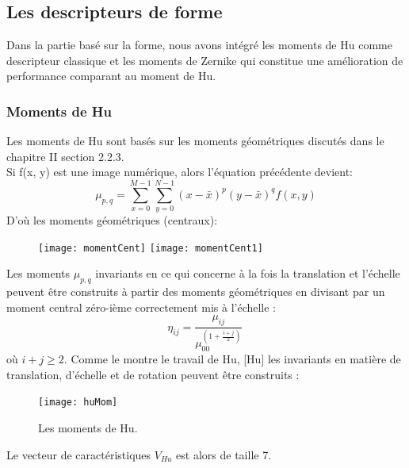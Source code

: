 \subsection{Les descripteurs de forme}
Dans la partie basé sur la forme, nous avons intégré les moments de Hu comme descripteur classique et les moments de Zernike qui constitue une amélioration de performance comparant au moment de Hu.
\subsubsection{Moments de Hu}
Les moments de Hu sont basés sur les moments géométriques discutés dans le chapitre II section 2.2.3.\\
Si ƒ(x, y) est une image numérique, alors l'équation précédente devient:
\begin{equation}
\mu_{p,q} = \sum_{x=0}^{M-1}\sum_{y=0}^{N-1} (x- \bar{x})^p (y-\bar{x})^q f(x, y)
\end{equation}
D'où les moments géométriques (centraux):
\begin{figure}[H]
	\texttt{[image: momentCent]} \texttt{[image: momentCent1]}
\end{figure}
Les moments $ \mu_{p,q} $ invariants en ce qui concerne à la fois la translation et l'échelle peuvent être construits à partir des moments géométriques en divisant par un moment central zéro-ième correctement mis à l'échelle :
\begin{equation}
\eta _{{ij}}={\frac  {\mu _{{ij}}}{\mu _{{00}}^{{\left(1+{\frac  {i+j}{2}}\right)}}}}\,\!
\end{equation}
où $ i + j \ge 2 $.
Comme le montre le travail de Hu, [Hu] les invariants en matière de translation, d'échelle et de rotation peuvent être construits :
\begin{figure}[H]
	\centering
	\texttt{[image: huMom]}
	\caption{Les moments de Hu.}
\end{figure}

Le vecteur de caractéristiques $ V_{Hu} $ est alors de taille 7.
